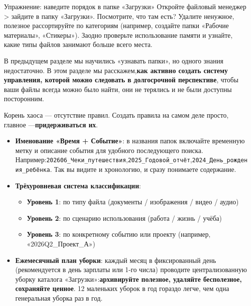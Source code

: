 \begin{tcbpractice}{Упражнение: наведите порядок в папке «Загрузки»}
Откройте файловый менеджер > зайдите в папку «Загрузки». Посмотрите, что там есть? Удалите ненужное, полезное рассортируйте по категориям (например, создайте папки «Рабочие материалы», «Стикеры»). Заодно проверьте использование памяти и узнайте, какие типы файлов занимают больше всего места.

\end{tcbpractice}


В предыдущем разделе мы научились «узнавать папки», но одного знания недостаточно. В этом разделе мы расскажем,\textbf{как активно создать систему управления, которой можно следовать в долгосрочной перспективе}, чтобы ваши файлы всегда можно было найти, они не терялись и не были доступны посторонним.


Корень хаоса — отсутствие правил. Создать правила на самом деле просто, главное —\textbf{придерживаться их}.

\begin{itemize}
  \item \textbf{Именование «Время + Событие»}: в названия папок включайте временную метку и описание события для удобного последующего поиска. Например:\texttt{202606\_Чеки\_путешествия},\texttt{2025\_Годовой\_отчёт},\texttt{2024\_День\_рождения\_ребёнка}. Так вы видите и хронологию, и сразу понимаете содержание.
  \item \textbf{Трёхуровневая система классификации}:
  \begin{itemize}
    \item \textbf{Уровень 1}: по типу файла (документы / изображения / видео / аудио)
    \item \textbf{Уровень 2}: по сценарию использования (работа / жизнь / учёба)
    \item \textbf{Уровень 3}: по конкретному событию или проекту (например, «2026Q2\_Проект\_А»)
  \end{itemize}
  \item \textbf{Ежемесячный план уборки}: каждый месяц в фиксированный день (рекомендуется в день зарплаты или 1-го числа) проводите централизованную уборку каталога «Загрузки»:\textbf{архивируйте полезное, удаляйте бесполезное, сохраняйте ценное}. 12 маленьких уборок в год гораздо легче, чем одна генеральная уборка раз в год.
\end{itemize}

